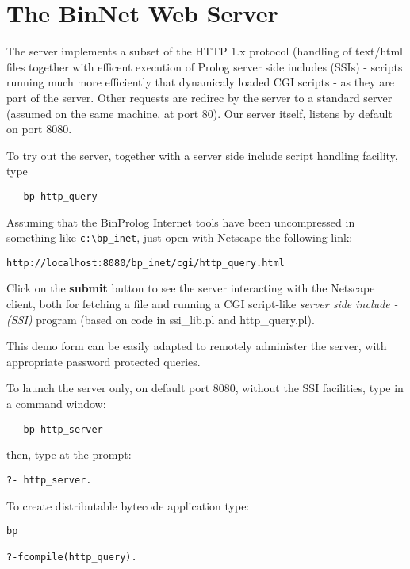 \documentclass{article}
\begin{document}
\section{The BinNet Web Server}

The server implements a subset of the HTTP 1.x protocol (handling of text/html
files together with efficent execution of Prolog server side includes (SSIs) - scripts
running much more efficiently that dynamicaly loaded CGI scripts - as they are
part of the server. Other requests are redirec by the server to  a standard
server (assumed on the same machine, at port 80). Our server itself,
listens by default on port 8080.

To try out the server, together with a server side include
script handling facility, type

\begin{verbatim}
   bp http_query
\end{verbatim}

Assuming that the BinProlog Internet tools have been
uncompressed in something like \verb~c:\bp_inet~,
just open with Netscape the following link:

\begin{verbatim}
http://localhost:8080/bp_inet/cgi/http_query.html
\end{verbatim}

Click on the {\bf submit} button to see the server interacting
with the Netscape client, both for fetching a file and
running a CGI script-like {\em server side include - (SSI)} program
(based on code in ssi\_lib.pl and http\_query.pl).

This demo form can be easily adapted to remotely
administer the server, with appropriate password
protected queries.

To launch the server only, on default port 8080,
without the SSI facilities, type in a command window:

\begin{verbatim}
   bp http_server
\end{verbatim}

then, type at the prompt:

\begin{verbatim}
?- http_server.
\end{verbatim}

To create distributable bytecode application type:

\begin{verbatim}
bp

?-fcompile(http_query).
\end{verbatim}
\end{document}
